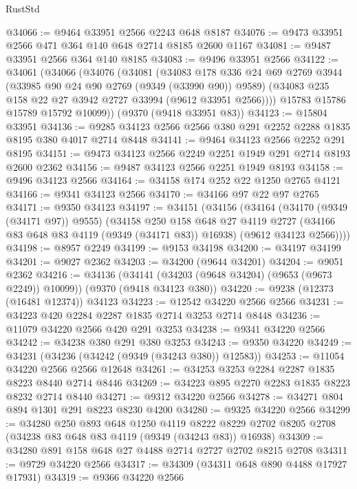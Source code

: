 \begin{lexlean}{RustStd}
\begin{coremodule}
{\begin{coremodule}
{{{{{{{{{{{{{{{{{{{{{{{{{{{{{{{{{{{{{{{@34066 := @9464 @33951 @2566 @2243 @648 @8187
@34076 := @9473 @33951 @2566 @471 @364 @140 @648 @2714 @8185 @2600 @1167
@34081 := @9487 @33951 @2566 @364 @140 @8185
@34083 := @9496 @33951 @2566
@34122 := @34061
    (@34066
      (@34076
        (@34081
          (@34083
            @178
            @336
            @24
            @69
            @2769
            @3944
            (@33985 @90 @24 @90 @2769 (@9349 (@33990 @90)) @9589)
            (@34083 @235 @158 @22 @27 @3942 @2727 @33994 (@9612 @33951 @2566))))
        @15783
        @15786
        @15789
        @15792
        @10099))
    (@9370 (@9418 @33951 @83))
@34123 := @15804 @33951
@34136 := @9285 @34123 @2566 @2566 @380 @291 @2252 @2288 @1835 @8195 @380 @4017 @2714 @8448
@34141 := @9464 @34123 @2566 @2252 @291 @8195
@34151 := @9473 @34123 @2566 @2249 @2251 @1949 @291 @2714 @8193 @2600 @2362
@34156 := @9487 @34123 @2566 @2251 @1949 @8193
@34158 := @9496 @34123 @2566
@34164 := @34158 @174 @252 @22 @1250 @2765 @4121
@34166 := @9341 @34123 @2566
@34170 := @34166 @97 @22 @97 @2765
@34171 := @9350 @34123
@34197 := @34151
    (@34156
      (@34164
        (@34170 (@9349 (@34171 @97)) @9555)
        (@34158
          @250
          @158
          @648
          @27
          @4119
          @2727
          (@34166 @83 @648 @83 @4119 (@9349 (@34171 @83)) @16938)
          (@9612 @34123 @2566))))
@34198 := @8957 @2249
@34199 := @9153 @34198
@34200 := @34197 @34199
@34201 := @9027 @2362
@34203 := @34200 (@9644 @34201)
@34204 := @9051 @2362
@34216 := @34136
    (@34141 (@34203 (@9648 @34204) (@9653 (@9673 @2249)) @10099))
    (@9370 (@9418 @34123 @380))
@34220 := @9238 (@12373 (@16481 @12374)) @34123
@34223 := @12542 @34220 @2566 @2566
@34231 := @34223 @420 @2284 @2287 @1835 @2714 @3253 @2714 @8448
@34236 := @11079 @34220 @2566 @420 @291 @3253
@34238 := @9341 @34220 @2566
@34242 := @34238 @380 @291 @380 @3253
@34243 := @9350 @34220
@34249 := @34231 (@34236 (@34242 (@9349 (@34243 @380)) @12583))
@34253 := @11054 @34220 @2566 @2566 @12648
@34261 := @34253 @3253 @2284 @2287 @1835 @8223 @8440 @2714 @8446
@34269 := @34223 @895 @2270 @2283 @1835 @8223 @8232 @2714 @8440
@34271 := @9312 @34220 @2566
@34278 := @34271 @804 @894 @1301 @291 @8223 @8230 @4200
@34280 := @9325 @34220 @2566
@34299 := @34280
    @250
    @893
    @648
    @1250
    @4119
    @8222
    @8229
    @2702
    @8205
    @2708
    (@34238 @83 @648 @83 @4119 (@9349 (@34243 @83)) @16938)
@34309 := @34280 @891 @158 @648 @27 @4488 @2714 @2727 @2702 @8215 @2708
@34311 := @9729 @34220 @2566
@34317 := @34309 (@34311 @648 @890 @4488 @17927 @17931)
@34319 := @9366 @34220 @2566
}}}}}}}}}}}}}}}}}}}}}}}}}}}}}}}}}}}}}}}
\end{coremodule}}
\end{coremodule}
\end{lexlean}
